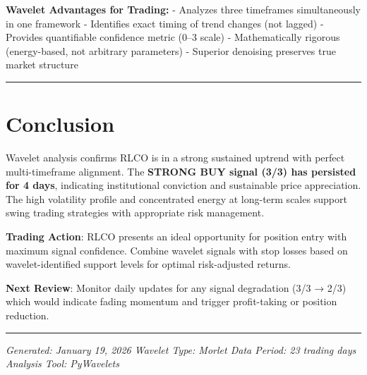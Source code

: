 \documentclass[
  11pt,
]{article}
\begin{document}
\textbf{Wavelet Advantages for Trading:} - Analyzes three timeframes
simultaneously in one framework - Identifies exact timing of trend
changes (not lagged) - Provides quantifiable confidence metric (0--3
scale) - Mathematically rigorous (energy-based, not arbitrary
parameters) - Superior denoising preserves true market structure

\begin{center}\rule{0.5\linewidth}{0.5pt}\end{center}

\section{Conclusion}\label{conclusion}

Wavelet analysis confirms RLCO is in a strong sustained uptrend with
perfect multi-timeframe alignment. The \textbf{STRONG BUY signal (3/3)
has persisted for 4 days}, indicating institutional conviction and
sustainable price appreciation. The high volatility profile and
concentrated energy at long-term scales support swing trading strategies
with appropriate risk management.

\textbf{Trading Action}: RLCO presents an ideal opportunity for position
entry with maximum signal confidence. Combine wavelet signals with stop
losses based on wavelet-identified support levels for optimal
risk-adjusted returns.

\textbf{Next Review}: Monitor daily updates for any signal degradation
(3/3 → 2/3) which would indicate fading momentum and trigger
profit-taking or position reduction.

\begin{center}\rule{0.5\linewidth}{0.5pt}\end{center}

\emph{Generated: January 19, 2026 \textbar{} Wavelet Type: Morlet
\textbar{} Data Period: 23 trading days \textbar{} Analysis Tool:
PyWavelets}
\end{document}

